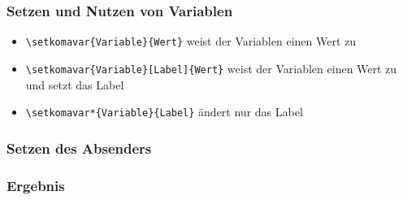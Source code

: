 \documentclass[12pt,ngerman]{beamer}
\begin{document}
\begin{frame}[containsverbatim]
\frametitle{Setzen und Nutzen von Variablen}

\begin{itemize}
	\item \lstinline|\setkomavar{Variable}{Wert}| weist der Variablen einen Wert zu
	\item \lstinline|\setkomavar{Variable}[Label]{Wert}| weist der Variablen einen Wert zu und setzt das Label
	\item \lstinline|\setkomavar*{Variable}{Label}| ändert nur das Label
\end{itemize}
\end{frame}

\begin{frame}[fragile]
\frametitle{Setzen des Absenders}



\end{frame}

\begin{frame}[plain]
\frametitle{Ergebnis}

\begin{center}
\end{center}
\end{frame}
\end{document}

